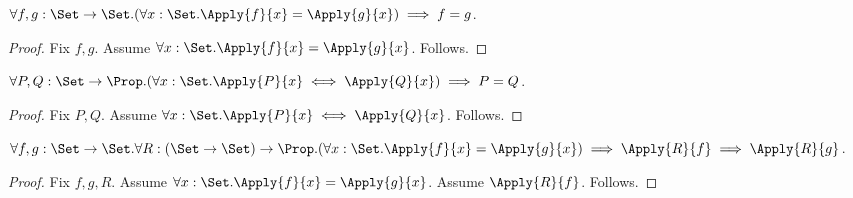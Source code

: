 \begin{proposition}\label{eta_function_equality}
    $\forall f,g:\Set\to\Set.
        (\forall x:\Set. \Apply{f}{x}=\Apply{g}{x}) \implies f=g$.
\end{proposition}
\begin{proof}
    Fix $f,g$.
    Assume $\forall x:\Set. \Apply{f}{x}=\Apply{g}{x}$.
    Follows.
\end{proof}

\begin{proposition}\label{eta_predicate_equality}
    $\forall P,Q:\Set\to\Prop.
        (\forall x:\Set. \Apply{P}{x}\iff\Apply{Q}{x}) \implies P=Q$.
\end{proposition}
\begin{proof}
    Fix $P,Q$.
    Assume $\forall x:\Set. \Apply{P}{x}\iff\Apply{Q}{x}$.
    Follows.
\end{proof}

\begin{proposition}\label{eta_argument_transport}
    $\forall f,g:\Set\to\Set. \forall R:(\Set\to\Set)\to\Prop.
        (\forall x:\Set. \Apply{f}{x}=\Apply{g}{x})
        \implies \Apply{R}{f} \implies \Apply{R}{g}$.
\end{proposition}
\begin{proof}
    Fix $f,g,R$.
    Assume $\forall x:\Set. \Apply{f}{x}=\Apply{g}{x}$.
    Assume $\Apply{R}{f}$.
    Follows.
\end{proof}
